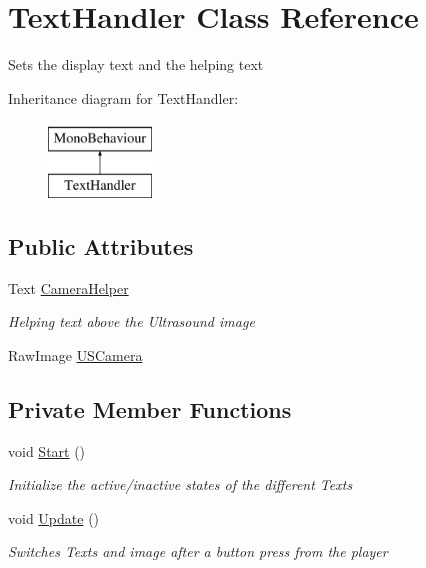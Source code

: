 \hypertarget{class_text_handler}{}\section{Text\+Handler Class Reference}
\label{class_text_handler}


Sets the display text and the helping text  


Inheritance diagram for Text\+Handler\+:\begin{figure}[H]
\begin{center}
\leavevmode
\includegraphics[height=2.000000cm]{class_text_handler}
\end{center}
\end{figure}
\subsection*{Public Attributes}
\begin{DoxyCompactItemize}
\item 
Text \mbox{\hyperlink{class_text_handler_a0fe6e79c5dcffb531a1049c23e51744c}{Camera\+Helper}}
\begin{DoxyCompactList}\small\item\em Helping text above the Ultrasound image \end{DoxyCompactList}\item 
Raw\+Image \mbox{\hyperlink{class_text_handler_a7a3795c8944b19e170d1356e7905e276}{U\+S\+Camera}}
\end{DoxyCompactItemize}
\subsection*{Private Member Functions}
\begin{DoxyCompactItemize}
\item 
void \mbox{\hyperlink{class_text_handler_a89acdf898a4c68246556a9d842d5f7bb}{Start}} ()
\begin{DoxyCompactList}\small\item\em Initialize the active/inactive states of the different Texts \end{DoxyCompactList}\item 
void \mbox{\hyperlink{class_text_handler_af98485530413e928b4af25c1571c715a}{Update}} ()
\begin{DoxyCompactList}\small\item\em Switches Texts and image after a button press from the player \end{DoxyCompactList}\end{DoxyCompactItemize}


